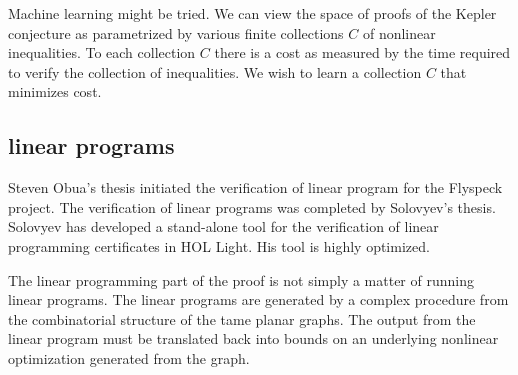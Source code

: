 \documentclass{amsart}
\begin{document}
Machine learning might be tried.  We can view the space of proofs of
the Kepler conjecture as parametrized by various finite collections
$C$ of nonlinear inequalities.  To each collection $C$ there is a cost
as measured by the time required to verify the collection of
inequalities.  We wish to learn a collection $C$ that minimizes cost.

\subsection{linear programs}

Steven Obua's thesis initiated the verification of linear program for
the Flyspeck project. The verification of linear programs was
completed by Solovyev's thesis.  Solovyev has developed a stand-alone
tool for the verification of linear programming certificates in HOL
Light.  His tool is highly optimized.

The linear programming part of the proof is not simply a matter of
running linear programs.  The linear programs are generated by a
complex procedure from the combinatorial structure of the tame planar
graphs.  The output from the linear program must be translated back
into bounds on an underlying nonlinear optimization generated from the
graph.







\newpage


 

\end{document}
